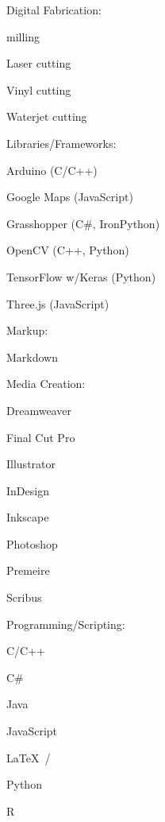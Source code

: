 \documentclass[letterpaper, oneside, 10pt]{article}
\begin{document}
\begin{multicols}{2}
{  {\jostmedium Digital Fabrication:}%
    \begin{itemize*}[%
      label=\relax, labelwidth=0pt, itemjoin=\space\char"00B7%
    ]%
      \item {}%
      \item {} milling%
      \item Laser cutting%
      \item Vinyl cutting%
      \item Waterjet cutting%
    \end{itemize*}


  {\jostmedium Libraries/Frameworks:}%
    \begin{itemize*}[%
      label=\relax, labelwidth=0pt, itemjoin=\space\char"00B7%
    ]%
      \item Arduino  (C/C++)%
      \item Google Maps  (JavaScript)%
      \item Grasshopper  (C\#, IronPython)%
      \item OpenCV (C++, Python)%
      \item TensorFlow w/Keras (Python)%
      \item Three.js (JavaScript)%
    \end{itemize*}


  {\jostmedium Markup:}%
    \begin{itemize*}[%
      label=\relax, labelwidth=0pt, itemjoin=\space\char"00B7%
    ]%
      \item {}%
      \item {}%
      \item Markdown%
    \end{itemize*}


  {\jostmedium Media Creation:}%
    \begin{itemize*}[%
      label=\relax, labelwidth=0pt, itemjoin=\space\char"00B7%
    ]%
      \item Dreamweaver%
      \item Final Cut Pro%
      \item Illustrator%
      \item InDesign%
      \item Inkscape%
      \item Photoshop%
      \item Premeire%
      \item Scribus%
    \end{itemize*}


  {\jostmedium Programming/Scripting:}%
    \begin{itemize*}[%
      label=\relax, labelwidth=0pt, itemjoin=\space\char"00B7%
    ]%
      \item C/C++%
      \item C\#%
      \item Java%
      \item JavaScript%
      \item \LaTeX\ /\ %
      \item Python%
      \item R%
    \end{itemize*}

}
\end{multicols}
\end{document}
